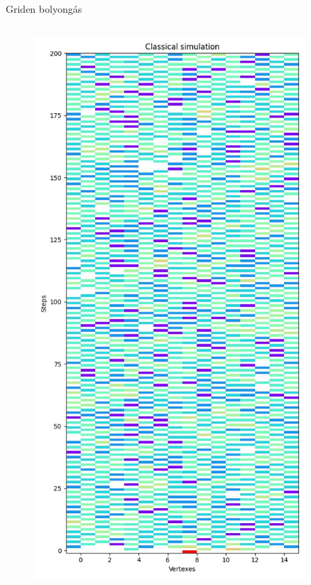 \documentclass[aspectratio=169]{beamer}
\begin{document}
\begin{frame}{Griden bolyongás}

  \begin{columns}[onlytextwidth]
    \begin{column}{.23\textwidth}
      \begin{figure}
        \includegraphics[width=0.9\textwidth]{./tdk_figures/results/grid/classical.jpg}
      \end{figure}
    \end{column}

\end{columns}
\end{frame}
\end{document}
